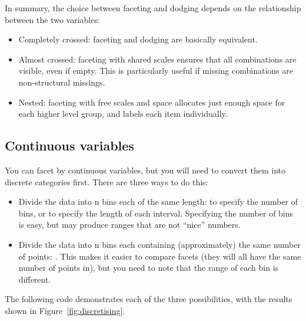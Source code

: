 In summary, the choice between faceting and dodging depends on the relationship between the two variables:

\begin{itemize}
  \item Completely crossed: faceting and dodging are basically equivalent.

  \item Almost crossed: faceting with shared scales ensures that all combinations are visible, even if empty. This is particularly useful if missing combinations are non-structural missings.

  \item Nested: faceting with free scales and space allocates just enough space for each higher level group, and labels each item individually.
\end{itemize}

\subsection{Continuous variables}\label{sub:continuous_variables}

You can facet by continuous variables, but you will need to convert them into discrete categories first. There are three ways to do this:

\begin{itemize}
  \item Divide the data into n bins each of the same length:  to specify the number of bins, or  to specify the length of each interval.  Specifying the number of bins is easy, but may produce ranges that are not ``nice'' numbers.
  
  \item Divide the data into n bins each containing (approximately) the same number of points: .  This makes it easier to compare facets (they will all have the same number of points in), but you need to note that the range of each bin is different.
    
\end{itemize}

\noindent The following code demonstrates each of the three possibilities, with the results shown in Figure~\ref{fig:discretising}.

% 
%


